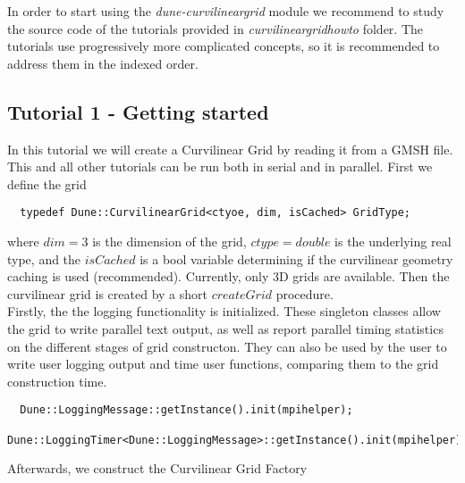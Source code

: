 \noindent
In order to start using the \textit{dune-curvilineargrid} module we recommend to study the source code of the tutorials provided in \textit{curvilineargridhowto} folder. The tutorials use progressively more complicated concepts, so it is recommended to address them in the indexed order.

\subsection{Tutorial 1 - Getting started}
\label{usage-howto-tutorial-gettingstarted}

\noindent
In this tutorial we will create a Curvilinear Grid by reading it from a GMSH file. This and all other tutorials can be run both in serial and in parallel. First we define the grid \\

\begin{mybox}
\begin{lstlisting}
  typedef Dune::CurvilinearGrid<ctyoe, dim, isCached> GridType;
\end{lstlisting}
\end{mybox}

\noindent
where $dim=3$ is the dimension of the grid, $ctype=double$ is the underlying real type, and the $isCached$ is a bool variable determining if the curvilinear geometry caching is used (recommended). Currently, only 3D grids are available. Then the curvilinear grid is created by a short $createGrid$ procedure.  \\

\noindent
Firstly, the the logging functionality is initialized. These singleton classes allow the grid to write parallel text output, as well as report parallel timing statistics on the different stages of grid constructon. They can also be used by the user to write user logging output and time user functions, comparing them to the grid construction time. \\

\begin{mybox}
\begin{lstlisting}
  Dune::LoggingMessage::getInstance().init(mpihelper);
  Dune::LoggingTimer<Dune::LoggingMessage>::getInstance().init(mpihelper);
\end{lstlisting}
\end{mybox}

\noindent
Afterwards, we construct the Curvilinear Grid Factory \\

